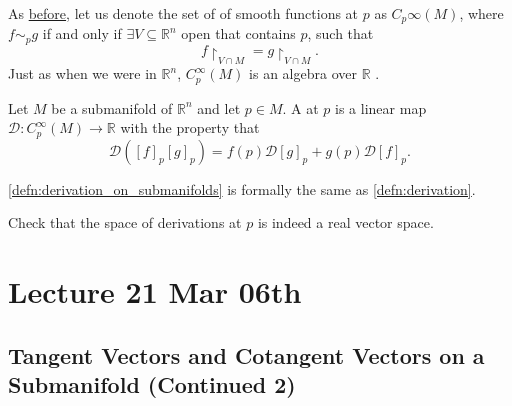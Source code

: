 \documentclass[notoc,notitlepage]{tufte-book}
\begin{document}
As \hyperref[defn:germ_of_functions]{before}, let us denote the set of
 of smooth functions at $p$ as $C_p\infty(M)$, where $f \sim_p g$
if and only if $\exists V \subseteq \mathbb{R}^n$ open that contains $p$, such
that
\begin{equation*}
  f \restriction_{V \cap M} = g \restriction_{V \cap M}.
\end{equation*}
Just as when we were in $\mathbb{R}^n$, $C_p^\infty(M)$ is an algebra over
$\mathbb{R}$ .

\begin{defn}\label{defn:derivation_on_submanifolds}
  Let $M$ be a submanifold of $\mathbb{R}^n$ and let $p \in M$. A
   at $p$ is a linear map $\mathcal{D} : C_p^\infty(M) \to
  \mathbb{R}$ with the property that
  \begin{equation*}
    \mathcal{D}([f]_p [g]_p) = f(p) \mathcal{D}[g]_p + g(p) \mathcal{D}[f]_p.
  \end{equation*}
\end{defn}

\begin{note}
  \cref{defn:derivation_on_submanifolds} is formally the same as
  \cref{defn:derivation}.
\end{note}

\begin{ex}
  Check that the space of derivations at $p$ is indeed a real vector space.
\end{ex}



\chapter{Lecture 21 Mar 06th}%
\label{chp:lecture_21_mar_06th}

\section{Tangent Vectors and Cotangent Vectors on a Submanifold (Continued 2)}%
\label{sec:tangent_vectors_and_cotangent_vectors_on_a_submanifold_continued_2}
\end{document}
